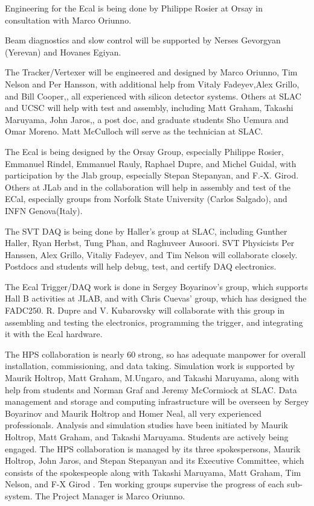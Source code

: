 Engineering for the Ecal is being done by Philippe Rosier at Orsay in consultation with Marco Oriunno. 

Beam diagnostics and slow control will be supported by Nerses Gevorgyan (Yerevan) and Hovanes Egiyan.

 
The Tracker/Vertexer will be engineered and designed by Marco Oriunno, Tim Nelson and Per Hansson, with additional help from Vitaly Fadeyev,Alex Grillo, and Bill Cooper,, all experienced with silicon detector systems. Others at SLAC and UCSC will help with test and assembly, including Matt Graham, Takashi Maruyama, John Jaros,, a post doc, and graduate students Sho Uemura and Omar Moreno.  Matt McCulloch will serve as the  technician at SLAC. 

The Ecal is being designed by the Orsay Group, especially Philippe Rosier, Emmanuel Rindel, Emmanuel Rauly, Raphael Dupre, and Michel Guidal, with participation by the Jlab group, especially Stepan Stepanyan, and F.-X. Girod. Others at JLab and in the collaboration will help in assembly and test of the ECal, especially groups from Norfolk State University (Carlos Salgado), and INFN Genova(Italy). 
 
The SVT DAQ is being done by Haller's group at SLAC, including Gunther Haller, Ryan Herbst, Tung Phan, and Raghuveer Ausoori. SVT Physicists Per Hanssen, Alex Grillo, Vitaliy Fadeyev, and Tim Nelson will collaborate closely. Postdocs and students will help debug, test, and certify DAQ electronics. 

The Ecal Trigger/DAQ work is done in Sergey Boyarinov's group, which supports Hall B activities at JLAB, and with Chris Cuevas' group, which has designed the FADC250. R. Dupre and V. Kubarovsky will collaborate with this group in assembling and testing the electronics, programming the trigger, and integrating it with the Ecal hardware.

 The HPS collaboration is nearly 60 strong, so has adequate manpower for overall installation, commissioning, and data taking.  Simulation work is supported by Maurik Holtrop, Matt Graham, M.Ungaro, and Takashi Maruyama, along with help from students and Norman Graf  and Jeremy McCormiock at SLAC. Data management and storage and computing infrastructure will be overseen by Sergey Boyarinov and Maurik Holtrop and Homer Neal, all very experienced professionals. Analysis and simulation studies have been initiated by Maurik Holtrop, Matt Graham, and Takashi Maruyama. Students are actively being engaged. 
The HPS collaboration is managed by its three spokespersons, Maurik Holtrop, John Jaros, and Stepan Stepanyan and its Executive Committee, which consists of the spokespeople along with Takashi Maruyama, Matt Graham, Tim Nelson, and F-X Girod . Ten working groups supervise the progress of each sub-system. The Project Manager is Marco Oriunno.

